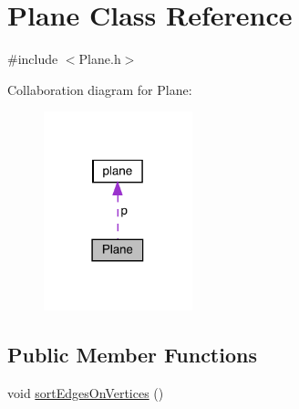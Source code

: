 \hypertarget{class_plane}{}\section{Plane Class Reference}
\label{class_plane}


{\ttfamily \#include $<$Plane.\+h$>$}



Collaboration diagram for Plane\+:
\nopagebreak
\begin{figure}[H]
\begin{center}
\leavevmode
\includegraphics[width=122pt]{class_plane__coll__graph}
\end{center}
\end{figure}
\subsection*{Public Member Functions}
\begin{DoxyCompactItemize}
\item 
void \mbox{\hyperlink{class_plane_ad2708bd985955c7f978a191f4e9249ac}{sort\+Edges\+On\+Vertices}} ()
\end{DoxyCompactItemize}
